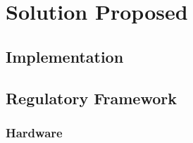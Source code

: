 \chapter{Solution Proposed}\label{chap:4}

\section{Implementation}\label{sec:chap4_impl}

\section{Regulatory Framework}\label{sec:chap4_reg}


\subsection{Hardware}\label{sec:chap4_arch_hard}



